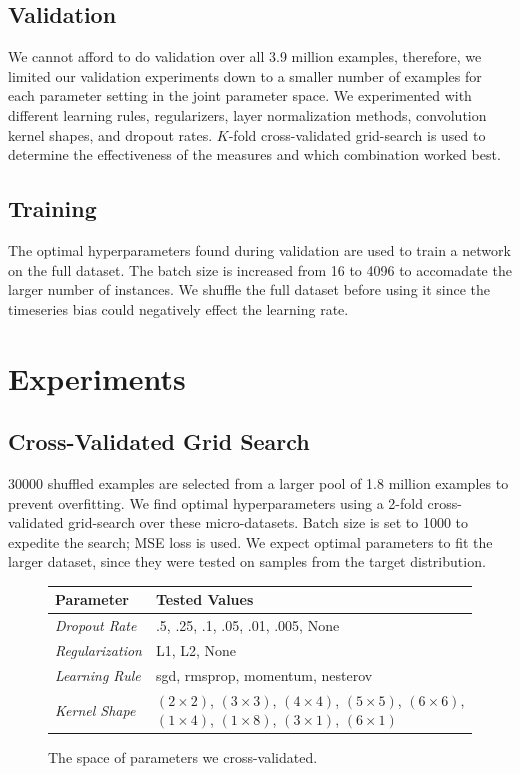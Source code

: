 \documentclass{article}
\begin{document}
\subsection{Validation}

We cannot afford to do validation over all 3.9 million examples, therefore, we limited our validation experiments down to a smaller number of examples for each parameter setting in the joint parameter space.  We experimented with different learning rules, regularizers, layer normalization methods, convolution kernel shapes, and dropout rates.  $K$-fold cross-validated grid-search is used to determine the effectiveness of the measures and which combination worked best.

\subsection{Training}

The optimal hyperparameters found during validation are used to train a network on the full dataset.  The batch size is increased from 16 to 4096 to accomadate the larger number of instances.  We shuffle the full dataset before using it since the timeseries bias could negatively effect the learning rate.

\section{Experiments}

\subsection{Cross-Validated Grid Search}

30000 shuffled examples are selected from a larger pool of 1.8 million examples to prevent overfitting.  We find optimal hyperparameters using a 2-fold cross-validated grid-search over these micro-datasets.  Batch size is set to 1000 to expedite the search; MSE loss is used.  We expect optimal parameters to fit the larger dataset, since they were tested on samples from the target distribution.

\begin{figure}[ht]
\centering
\begin{tabular}{|l|l|}
\hline
\textbf{Parameter} & \textbf{Tested Values} \\
\hline
\textit{Dropout Rate} &  .5, .25, .1, .05, .01, .005, None \\
\textit{Regularization} &  L1, L2, None \\
\textit{Learning Rule} & sgd, rmsprop, momentum, nesterov \\
\textit{Kernel Shape} & $(2\times 2)$, $(3\times 3)$, $(4\times 4)$, $(5\times 5)$, $(6\times 6)$, $(1\times 4)$, $(1\times 8)$, $(3\times 1)$, $(6\times 1)$ \\
\hline
\end{tabular}
\caption{The space of parameters we cross-validated.}
\end{figure}
\end{document}
